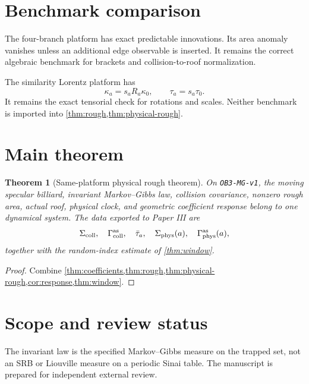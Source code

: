 \documentclass[11pt,reqno]{amsart}
\newtheorem{theorem}{Theorem}[section]
\theoremstyle{definition}
\theoremstyle{remark}
\begin{document}
\section{Benchmark comparison}\label{sec:benchmarks}

The four-branch platform has exact predictable innovations.  Its area anomaly
vanishes unless an additional edge observable is inserted.  It remains the
correct algebraic benchmark for brackets and collision-to-roof normalization.

The similarity Lorentz platform has
\[
 \kappa_a=s_aR_a\kappa_0,\qquad
 \tau_a=s_a\tau_0.
\]
It remains the exact tensorial check for rotations and scales.  Neither
benchmark is imported into \cref{thm:rough,thm:physical-rough}.

\section{Main theorem}

\begin{theorem}[Same-platform physical rough theorem]\label{thm:main}
On \texttt{OB3-MG-v1}, the moving specular billiard, invariant
Markov--Gibbs law, collision covariance, nonzero rough area, actual roof,
physical clock, and geometric coefficient response belong to one dynamical
system.  The data exported to Paper III are
\[
 \Sigma_{\rm coll},\quad
 \Gamma_{\rm coll}^{\rm as},\quad
 \bar\tau_a,\quad
 \Sigma_{\rm phys}(a),\quad
 \Gamma_{\rm phys}^{\rm as}(a),
\]
together with the random-index estimate of \cref{thm:window}.
\end{theorem}

\begin{proof}
Combine \cref{thm:coefficients,thm:rough,thm:physical-rough,cor:response,thm:window}.
\end{proof}

\section*{Scope and review status}

The invariant law is the specified Markov--Gibbs measure on the trapped set,
not an SRB or Liouville measure on a periodic Sinai table.  The manuscript is
prepared for independent external review.



\end{document}
